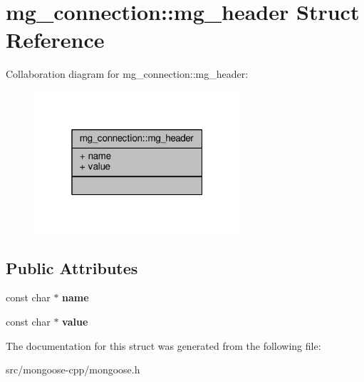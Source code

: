 \hypertarget{structmg__connection_1_1mg__header}{}\section{mg\+\_\+connection\+:\+:mg\+\_\+header Struct Reference}
\label{structmg__connection_1_1mg__header}


Collaboration diagram for mg\+\_\+connection\+:\+:mg\+\_\+header\+:
\nopagebreak
\begin{figure}[H]
\begin{center}
\leavevmode
\includegraphics[width=217pt]{db/ddc/structmg__connection_1_1mg__header__coll__graph}
\end{center}
\end{figure}
\subsection*{Public Attributes}
\begin{DoxyCompactItemize}
\item 
const char $\ast$ {\bfseries name}\hypertarget{structmg__connection_1_1mg__header_aedc58218d3a1364007fb40c85c77ed38}{}\label{structmg__connection_1_1mg__header_aedc58218d3a1364007fb40c85c77ed38}

\item 
const char $\ast$ {\bfseries value}\hypertarget{structmg__connection_1_1mg__header_af2b60bf6efc5265fceed591c6c2e0741}{}\label{structmg__connection_1_1mg__header_af2b60bf6efc5265fceed591c6c2e0741}

\end{DoxyCompactItemize}


The documentation for this struct was generated from the following file\+:\begin{DoxyCompactItemize}
\item 
src/mongoose-\/cpp/mongoose.\+h\end{DoxyCompactItemize}
